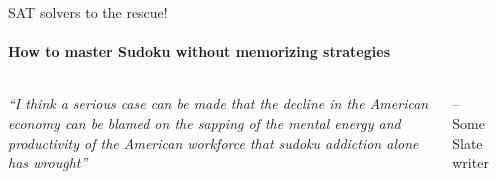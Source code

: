 \begin{frame}{SAT solvers to the rescue!}
    \framesubtitle{How to master Sudoku without memorizing strategies}
    \begin{columns}
        {\em
            ``I think a serious case can be made that the decline in the
            American economy can be blamed on the sapping of the mental energy
            and productivity of the American workforce that sudoku addiction
            alone has wrought''
        } \\
        \begin{flushright}
            -- Some Slate writer \\
        \end{flushright}

         \\

         {}
    \end{columns}
\end{frame}

